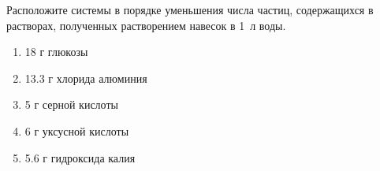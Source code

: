 
Расположите системы в
порядке уменьшения числа частиц, содержащихся в растворах, полученных
растворением навесок в 1~л воды.

\begin{enumerate}
    \item 18 г глюкозы
    \item 13.3 г хлорида алюминия
    \item 5 г серной кислоты
    \item 6 г уксусной кислоты
    \item 5.6 г гидроксида калия
\end{enumerate}



